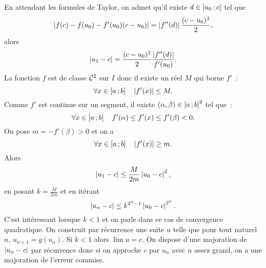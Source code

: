 En attendant les formules de Taylor, on admet qu'il existe $d \in \left] u_0 \, ;  c \right[$ tel que
\begin{equation}
  \left\lvert f(c)-f(u_0)-f'(u_0)(c-u_0)\right\rvert = \left\lvert f''(d)\right\rvert\frac{(c-u_0)^2}{2},
\end{equation}
alors
\begin{equation}
  \left\lvert u_1-c\right\rvert = \frac{(c-u_0)^2}{2} \frac{\left\lvert f''(d)\right\rvert}{f'(u_0)}.
\end{equation}
La fonction $f$ est de classe $\mathcal{C}^{2}$ sur $I$ donc il existe un réel $M$ qui borne $f'$~:
\begin{equation}
  \forall x \in \left[ a \, ;  b \right] \quad \left\lvert f'(x)\right\rvert \leq M.
\end{equation}
Comme $f'$ est continue sur un segment, il existe $(\alpha,\beta) \in \left[ a \, ;  b \right]^2$ tel que~:
\begin{equation}
  \forall x \in \left[ a \, ;  b \right] \quad f'(\alpha) \leq f'(x) \leq f'(\beta) <0.
\end{equation}
On pose $m=-f'(\beta)>0$ et on a
\begin{equation}
  \forall x \in \left[ a \, ;  b \right] \quad \left\lvert f'(x)\right\rvert \geq m.
\end{equation}
Alors
\begin{equation}
  \left\lvert u_1-c\right\rvert \leq \frac{M}{2m} \left\lvert u_0-c\right\rvert^2,
\end{equation}
en posant $k=\frac{M}{2m}$ et en itérant
\begin{equation}
  \left\lvert u_n-c\right\rvert \leq k^{2^n-1} \left\lvert u_0-c\right\rvert^{2^n}.
\end{equation}
C'est intéressant lorsque $k < 1$ et on parle dans ce cas de convergence quadratique. On construit par récurrence une suite $u$ telle que pour tout naturel $n$, $u_{n+1}=g(u_n)$. Si $k<1$ alors $\lim u =c$. On dispose d'une majoration de $\left\lvert u_n-c\right\rvert$ par récurrence donc si on approche $c$ par $u_n$ avec $n$ assez grand, on a une majoration de l'erreur commise.

